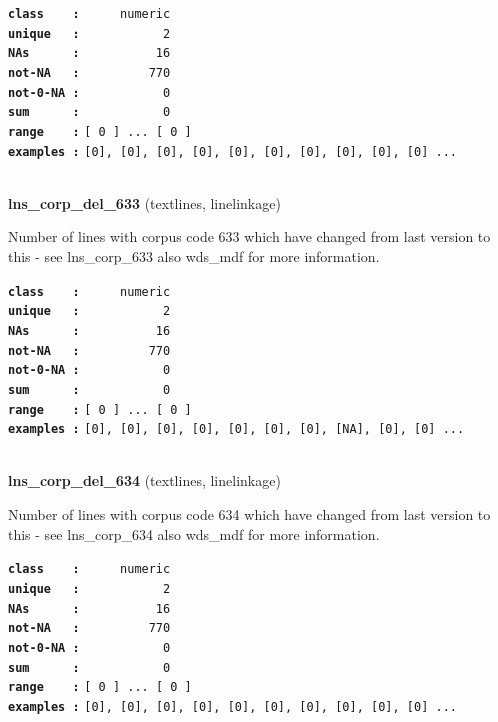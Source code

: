 \documentclass[]{article}
\begin{document}
\textbf{\texttt{class\ \ \ \ :}} \texttt{~~~~~numeric}\\
\textbf{\texttt{unique\ \ \ :}} \texttt{~~~~~~~~~~~2}\\
\textbf{\texttt{NAs\ \ \ \ \ \ :}} \texttt{~~~~~~~~~~16}\\
\textbf{\texttt{not-NA\ \ \ :}} \texttt{~~~~~~~~~770}\\
\textbf{\texttt{not-0-NA\ :}} \texttt{~~~~~~~~~~~0}\\
\textbf{\texttt{sum\ \ \ \ \ \ :}} \texttt{~~~~~~~~~~~0}\\
\textbf{\texttt{range\ \ \ \ :}}
\texttt{{[}\ 0\ {]}\ ...\ {[}\ 0\ {]}}\\
\textbf{\texttt{examples\ :}}
\texttt{{[}0{]},\ {[}0{]},\ {[}0{]},\ {[}0{]},\ {[}0{]},\ {[}0{]},\ {[}0{]},\ {[}0{]},\ {[}0{]},\ {[}0{]}\ ...}\\

~

\textbf{lns\_corp\_del\_633} (textlines, linelinkage)

Number of lines with corpus code 633 which have changed from last
version to this - see lns\_corp\_633 also wds\_mdf for more information.

\textbf{\texttt{class\ \ \ \ :}} \texttt{~~~~~numeric}\\
\textbf{\texttt{unique\ \ \ :}} \texttt{~~~~~~~~~~~2}\\
\textbf{\texttt{NAs\ \ \ \ \ \ :}} \texttt{~~~~~~~~~~16}\\
\textbf{\texttt{not-NA\ \ \ :}} \texttt{~~~~~~~~~770}\\
\textbf{\texttt{not-0-NA\ :}} \texttt{~~~~~~~~~~~0}\\
\textbf{\texttt{sum\ \ \ \ \ \ :}} \texttt{~~~~~~~~~~~0}\\
\textbf{\texttt{range\ \ \ \ :}}
\texttt{{[}\ 0\ {]}\ ...\ {[}\ 0\ {]}}\\
\textbf{\texttt{examples\ :}}
\texttt{{[}0{]},\ {[}0{]},\ {[}0{]},\ {[}0{]},\ {[}0{]},\ {[}0{]},\ {[}0{]},\ {[}NA{]},\ {[}0{]},\ {[}0{]}\ ...}\\

~

\textbf{lns\_corp\_del\_634} (textlines, linelinkage)

Number of lines with corpus code 634 which have changed from last
version to this - see lns\_corp\_634 also wds\_mdf for more information.

\textbf{\texttt{class\ \ \ \ :}} \texttt{~~~~~numeric}\\
\textbf{\texttt{unique\ \ \ :}} \texttt{~~~~~~~~~~~2}\\
\textbf{\texttt{NAs\ \ \ \ \ \ :}} \texttt{~~~~~~~~~~16}\\
\textbf{\texttt{not-NA\ \ \ :}} \texttt{~~~~~~~~~770}\\
\textbf{\texttt{not-0-NA\ :}} \texttt{~~~~~~~~~~~0}\\
\textbf{\texttt{sum\ \ \ \ \ \ :}} \texttt{~~~~~~~~~~~0}\\
\textbf{\texttt{range\ \ \ \ :}}
\texttt{{[}\ 0\ {]}\ ...\ {[}\ 0\ {]}}\\
\textbf{\texttt{examples\ :}}
\texttt{{[}0{]},\ {[}0{]},\ {[}0{]},\ {[}0{]},\ {[}0{]},\ {[}0{]},\ {[}0{]},\ {[}0{]},\ {[}0{]},\ {[}0{]}\ ...}\\
\end{document}
